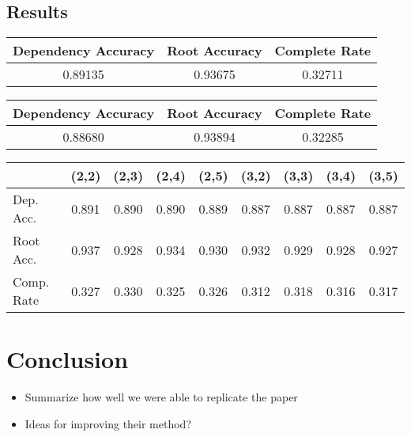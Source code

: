 \documentclass[12pt,fleqn]{article}
\begin{document}
\subsection{Results}

    \begin{center}
        \begin{tabular}{|c|c|c|}
            \hline Dependency Accuracy & Root Accuracy & Complete Rate \\ \hline
            0.89135 & 0.93675 & 0.32711 \\ \hline
        \end{tabular}
    \end{center}

    \begin{center}
        \begin{tabular}{|c|c|c|}
            \hline Dependency Accuracy & Root Accuracy & Complete Rate \\ \hline
            0.88680 & 0.93894 & 0.32285 \\ \hline
        \end{tabular}
    \end{center}


    \begin{center}
        \begin{tabular}{|l|cccc|cccc|}
            \cline{2-9} \multicolumn{1}{c|}{} & (2,2) & (2,3) & (2,4) & (2,5) & (3,2) & (3,3) & (3,4) & (3,5) \\ \hline
            Dep. Acc. & 0.891 & 0.890 & 0.890 & 0.889 & 0.887 & 0.887 & 0.887 & 0.887 \\
            Root Acc. & 0.937 & 0.928 & 0.934 & 0.930 & 0.932 & 0.929 & 0.928 & 0.927 \\
            Comp. Rate & 0.327 & 0.330 & 0.325 & 0.326 & 0.312 & 0.318 & 0.316 & 0.317 \\ \hline
        \end{tabular}
    \end{center}


\section{Conclusion}
\begin{itemize}
\item Summarize how well we were able to replicate the paper
\item Ideas for improving their method?
\end{itemize}
\end{document}
